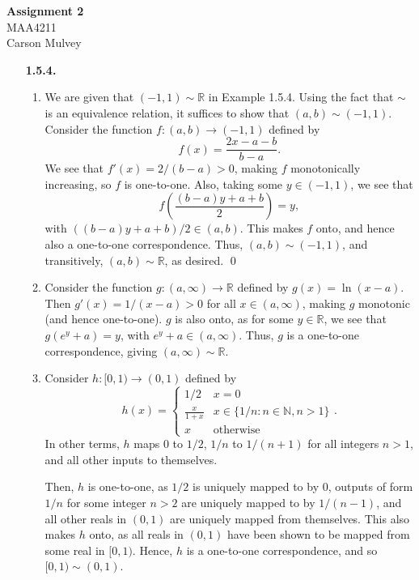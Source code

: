 \documentclass[11pt,letterpaper]{article}
\newcommand{\R}{\mathbb{R}}
\begin{document}
\begin{center}
    \begin{large}
        \textbf{Assignment 2} \\
        MAA4211 \\
        Carson Mulvey
    \end{large}
\end{center}

\begin{enumerate}
\item[\textbf{1.5.4.}]
\begin{enumerate}
    \item We are given that $(-1,1) \sim \R$ in Example 1.5.4. Using the fact that $\sim$ is an equivalence relation, it suffices to show that $(a,b) \sim (-1,1)$. Consider the function $f \colon (a,b) \to (-1,1)$ defined by
    \[
        f(x) = \frac{2x-a-b}{b-a}.
    \]
    We see that $f'(x)=2/(b-a)>0$, making $f$ monotonically increasing, so $f$ is one-to-one. Also, taking some $y \in (-1,1)$, we see that
    \[
        f\left(\frac{(b-a)y+a+b}{2}\right)=y,
    \]
    with $((b-a)y+a+b)/2 \in (a,b)$. This makes $f$ onto, and hence also a one-to-one correspondence. Thus, $(a,b) \sim (-1,1)$, and transitively, $(a,b) \sim \R$, as desired. \qed

    \item Consider the function $g \colon (a,\infty) \to \R$ defined by $g(x) = \ln(x-a)$. Then $g'(x)=1/(x-a)>0$ for all $x\in (a,\infty)$, making $g$ monotonic (and hence one-to-one). $g$ is also onto, as for some $y\in \R$, we see that $g(e^y+a)=y$, with $e^y+a \in (a,\infty)$. Thus, $g$ is a one-to-one correspondence, giving $(a,\infty) \sim \R$.
    
    \item Consider $h \colon [0,1) \to (0,1)$ defined by
    \[
        h(x) = \begin{cases} 
            1/2 & x = 0 \\
            \frac{x}{1+x} & x\in \{1/n : n\in \mathbb{N}, n>1 \} \\
            x & \text{otherwise}
         \end{cases}.
    \]
    In other terms, $h$ maps 0 to $1/2$, $1/n$ to $1/(n+1)$ for all integers $n>1$, and all other inputs to themselves.
    
    Then, $h$ is one-to-one, as $1/2$ is uniquely mapped to by 0, outputs of form $1/n$ for some integer $n>2$ are uniquely mapped to by $1/(n-1)$, and all other reals in $(0,1)$ are uniquely mapped from themselves.
    This also makes $h$ onto, as all reals in $(0,1)$ have been shown to be mapped from some real in $[0,1)$.
   Hence, $h$ is a one-to-one correspondence, and so $[0,1) \sim (0,1)$.


\end{enumerate}
\end{enumerate}
\end{document}
